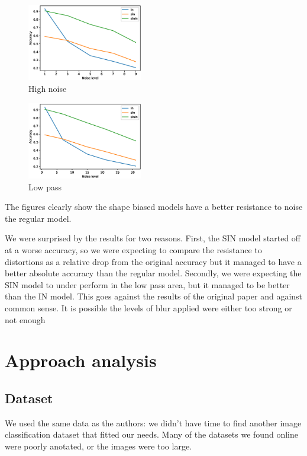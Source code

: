 \documentclass{article}
\begin{document}
\begin{figure}[h!]
\centering
\includegraphics[width = 0.45\textwidth]{imgs/high_pass}
\caption{High noise}
\end{figure}

\begin{figure}[h!]
\centering
\includegraphics[width = 0.45\textwidth]{imgs/low_pass}
\caption{Low pass}
\end{figure}

The figures clearly show the shape biased models have a better resistance to noise the regular model.

We were surprised by the results for two reasons.
First, the SIN model started off at a worse accuracy, so we were expecting to compare the resistance to distortions as a relative drop from the original accuracy but it managed to have a better absolute accuracy than the regular model.
Secondly, we were expecting the SIN model to under perform in the low pass area, but it managed to be better than the IN model. This goes against the results of the original paper and against common sense. It is possible the levels of blur applied were either too strong or not enough

\section{Approach analysis}

\subsection{Dataset}

We used the same data as the authors: we didn't have time
to find another image classification dataset that fitted our needs.
Many of the datasets we found online were poorly anotated, or the images
were too large.
\end{document}
